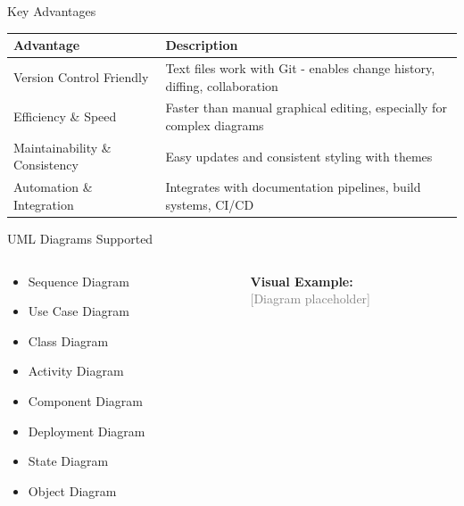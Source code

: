 \documentclass{beamer}
\begin{document}
\begin{frame}{Key Advantages}
    \begin{table}
    \small
    \begin{tabular}{p{} p{}}
    \textbf{Advantage} & \textbf{Description} \\
    \hline
    Version Control Friendly & Text files work with Git - enables change history, diffing, collaboration \\
    Efficiency \& Speed & Faster than manual graphical editing, especially for complex diagrams \\
    Maintainability \& Consistency & Easy updates and consistent styling with themes \\
    Automation \& Integration & Integrates with documentation pipelines, build systems, CI/CD \\
    \end{tabular}
    \end{table}
\end{frame}

\begin{frame}{UML Diagrams Supported}
    \begin{columns}
    \begin{column}{0.5\textwidth}
        \begin{itemize}
            \item Sequence Diagram
            \item Use Case Diagram
            \item Class Diagram
            \item Activity Diagram
            \item Component Diagram
            \item Deployment Diagram
            \item State Diagram
            \item Object Diagram
        \end{itemize}
    \end{column}
    \begin{column}{0.5\textwidth}
        \centering
        \textbf{Visual Example:}\\
        \textcolor{gray}{\scriptsize[Diagram placeholder]}
        \vspace{2cm}
    \end{column}
    \end{columns}
\end{frame}
\end{document}
